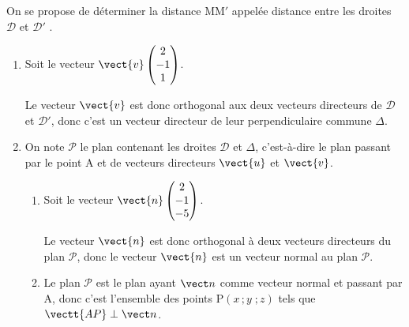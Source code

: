 On se propose de déterminer la distance MM$'$ appelée \og distance entre les droites $\mathcal{D}$ et $\mathcal{D}'$ \fg.

\begin{enumerate}[resume]
\item Soit le vecteur $\vect{v}\begin{pmatrix}2\\- 1\\1\end{pmatrix}$.


Le vecteur $\vect{v}$ est donc orthogonal aux deux vecteurs directeurs de $\mathcal{D}$ et $\mathcal{D}'$, donc c'est un vecteur directeur de leur perpendiculaire commune $\Delta$.

\item On note $\mathcal{P}$ le plan contenant les droites $\mathcal{D}$ et $\Delta$, c'est-à-dire le plan passant par le point A et de vecteurs directeurs $\vect{u}$ et $\vect{v}$.
	\begin{enumerate}
		\item Soit le vecteur $\vect{n}\begin{pmatrix}2\\-1\\-5 \end{pmatrix}$.
		

Le vecteur $\vect{n}$ est donc orthogonal à deux vecteurs directeurs du plan $\mathcal{P}$, donc le vecteur $\vect{n}$ est un vecteur normal au plan $\mathcal{P}$.
		
		\item %
Le plan $\mathcal{P}$ est le plan ayant $\vect n$ comme vecteur normal et passant par A, donc c'est  l'ensemble des points P$\left (x\,; y\;;z\right )$ tels que 
$\vectt{AP} \perp \vect n$.


\end{enumerate}
\end{enumerate}
